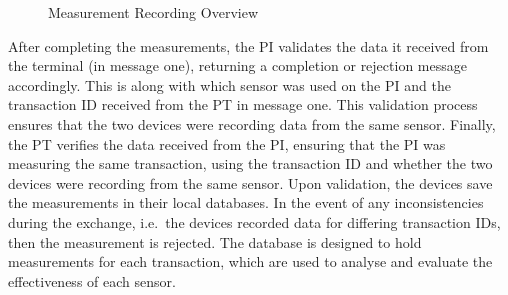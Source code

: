 \documentclass{article}
\begin{document}
\begin{figure}[ht]
	\centering
	\caption{Measurement Recording Overview}
	\label{fig:diagram}
\end{figure} 

After completing the measurements, the PI validates the data it received from the terminal (in message one), returning a completion or rejection message accordingly.  This is along with which sensor was used on the PI and the transaction ID received from the PT in message one.  This validation process ensures that the two devices were recording data from the same sensor.
Finally, the PT verifies the data received from the PI, ensuring that the PI was measuring the same transaction, using the transaction ID and whether the two devices were recording from the same sensor. Upon validation, the devices save the measurements in their local databases.  In the event of any inconsistencies during the exchange, i.e.\ the devices recorded data for differing transaction IDs, then the measurement is rejected.  The database is designed to hold measurements for each transaction, which are used to analyse and evaluate the effectiveness of each sensor.
\end{document}
